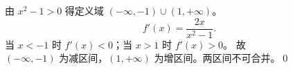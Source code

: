 由 $x^2-1>0$ 得定义域 $(-\infty,-1)\cup(1,+\infty)$。
\[
f'(x)=\frac{2x}{x^2-1}.
\]
当 $x<-1$ 时 $f'(x)<0$；当 $x>1$ 时 $f'(x)>0$。
故 $\boxed{(-\infty,-1)\text{ 为减区间，}(1,+\infty)\text{ 为增区间}}$。两区间不可合并。\qed
